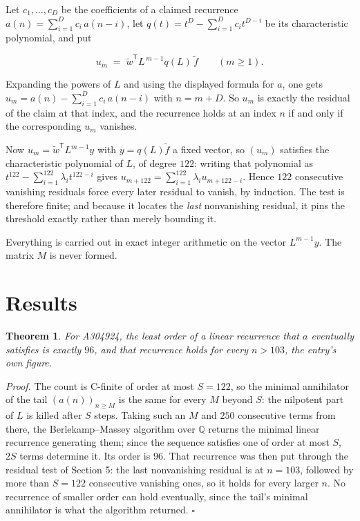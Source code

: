 \documentclass[11pt]{article}
\newtheorem{theorem}{Theorem}
\theoremstyle{definition}
\begin{document}
Let $c_1,\dots,c_D$ be the coefficients of a claimed recurrence $a(n) = \sum_{i=1}^{D} c_i\,a(n-i)$, let $q(t) = t^{D} - \sum_{i=1}^{D} c_i t^{D-i}$ be its characteristic polynomial, and put

\[u_m \;=\; \tilde w^{\mathsf T} L^{\,m-1} q(L)\,\tilde f \qquad (m \ge 1).\]

Expanding the powers of $L$ and using the displayed formula for $a$, one gets $u_m = a(n) - \sum_{i=1}^{D} c_i\,a(n-i)$ with $n = m + D$. So $u_m$ is exactly the residual of the claim at that index, and the recurrence holds at an index $n$ if and only if the corresponding $u_m$ vanishes.

Now $u_m = \tilde w^{\mathsf T} L^{m-1} y$ with $y = q(L)\tilde f$ a fixed vector, so $(u_m)$ satisfies the characteristic polynomial of $L$, of degree $122$: writing that polynomial as $t^{122} - \sum_{i=1}^{122} \lambda_i t^{122-i}$ gives $u_{m+122} = \sum_{i=1}^{122} \lambda_i u_{m+122-i}$. Hence $122$ consecutive vanishing residuals force every later residual to vanish, by induction. The test is therefore finite; and because it locates the {\itshape last} nonvanishing residual, it pins the threshold exactly rather than merely bounding it.

Everything is carried out in exact integer arithmetic on the vector $L^{m-1}y$. The matrix $M$ is never formed.

\section{Results}

\begin{theorem} For A304924, the least order of a linear recurrence that $a$ eventually satisfies is exactly $96$, and that recurrence holds for every $n > 103$, the entry's own figure.\end{theorem}

{\itshape Proof.} The count is C-finite of order at most $S = 122$, so the minimal annihilator of the tail $(a(n))_{n \ge M}$ is the same for every $M$ beyond $S$: the nilpotent part of $L$ is killed after $S$ steps. Taking such an $M$ and $250$ consecutive terms from there, the Berlekamp--Massey algorithm over $\mathbb{Q}$ returns the minimal linear recurrence generating them; since the sequence satisfies one of order at most $S$, $2S$ terms determine it. Its order is $96$. That recurrence was then put through the residual test of Section 5: the last nonvanishing residual is at $n = 103$, followed by more than $S = 122$ consecutive vanishing ones, so it holds for every larger $n$. No recurrence of smaller order can hold eventually, since the tail's minimal annihilator is what the algorithm returned. $\square$
\end{document}
